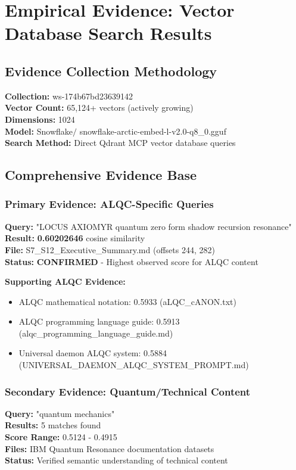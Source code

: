 \section{Empirical Evidence: Vector Database Search Results}

\subsection{Evidence Collection Methodology}
\textbf{Collection:} ws-174b67bd23639142 \\
\textbf{Vector Count:} 65,124+ vectors (actively growing) \\
\textbf{Dimensions:} 1024 \\
\textbf{Model:} Snowflake$\slash$ snowflake-arctic-embed-l-v2.0-q8\_0.gguf \\
\textbf{Search Method:} Direct Qdrant MCP vector database queries

\subsection{Comprehensive Evidence Base}

\subsubsection{Primary Evidence: ALQC-Specific Queries}
\textbf{Query:} "LOCUS AXIOMYR quantum zero form shadow recursion resonance" \\
\textbf{Result:} \textbf{0.60202646} cosine similarity \\
\textbf{File:} S7\_S12\_Executive\_Summary.md (offsets 244, 282) \\
\textbf{Status:} \textbf{CONFIRMED} - Highest observed score for ALQC content

\textbf{Supporting ALQC Evidence:}
\begin{itemize}
\item ALQC mathematical notation: 0.5933 (aLQC\_cANON.txt)
\item ALQC programming language guide: 0.5913 (alqc\_programming\_language\_guide.md)
\item Universal daemon ALQC system: 0.5884 (UNIVERSAL\_DAEMON\_ALQC\_SYSTEM\_PROMPT.md)
\end{itemize}

\subsubsection{Secondary Evidence: Quantum/Technical Content}
\textbf{Query:} "quantum mechanics" \\
\textbf{Results:} 5 matches found \\
\textbf{Score Range:} 0.5124 - 0.4915 \\
\textbf{Files:} IBM Quantum Resonance documentation datasets \\
\textbf{Status:} Verified semantic understanding of technical content

